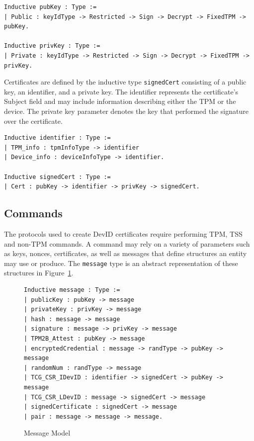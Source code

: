 \documentclass[runningheads]{llncs}
\begin{document}
\begin{lstlisting}[language=Coq]
Inductive pubKey : Type :=
| Public : keyIdType -> Restricted -> Sign -> Decrypt -> FixedTPM -> pubKey.

Inductive privKey : Type :=
| Private : keyIdType -> Restricted -> Sign -> Decrypt -> FixedTPM -> privKey.
\end{lstlisting}

Certificates are defined by the inductive type \verb|signedCert|
consisting of a public key, an identifier, and a private key. The
identifier represents the certificate's Subject field and may include
information describing either the TPM or the device. The private key
parameter denotes the key that performed the signature over the
certificate.

\begin{lstlisting}[language=Coq]
Inductive identifier : Type :=
| TPM_info : tpmInfoType -> identifier
| Device_info : deviceInfoType -> identifier.

Inductive signedCert : Type :=
| Cert : pubKey -> identifier -> privKey -> signedCert.
\end{lstlisting}

\subsection{Commands}

The protocols used to create DevID certificates require performing
TPM, TSS and non-TPM commands. A command may rely on a variety of
parameters such as keys, nonces, certificates, as well as messages
that define structures an entity may use or produce. The
\verb|message| type is an abstract representation of these structures
in Figure~\ref{fig:message-model}.

\begin{figure}[hbtp]
\begin{lstlisting}[language=Coq]
Inductive message : Type :=
| publicKey : pubKey -> message
| privateKey : privKey -> message
| hash : message -> message
| signature : message -> privKey -> message
| TPM2B_Attest : pubKey -> message
| encryptedCredential : message -> randType -> pubKey -> message
| randomNum : randType -> message
| TCG_CSR_IDevID : identifier -> signedCert -> pubKey -> message
| TCG_CSR_LDevID : message -> signedCert -> message
| signedCertificate : signedCert -> message
| pair : message -> message -> message.
\end{lstlisting}
\caption{Message Model}
\label{fig:message-model}
\end{figure}
\end{document}
